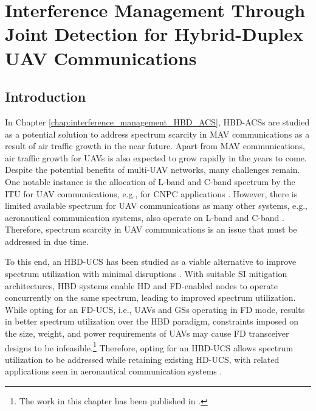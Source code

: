 \chapter{Interference Management Through Joint Detection for Hybrid-Duplex UAV Communications}
\label{chap:JD_HBD_UCS}
\section{Introduction}
In Chapter \ref{chap:interference_management_HBD_ACS}, HBD-ACSs are studied as a potential solution to address spectrum scarcity in MAV communications as a result of air traffic growth in the near future. Apart from MAV communications, air traffic growth for UAVs is also expected to grow rapidly in the years to come. Despite the potential benefits of multi-UAV networks, many challenges remain. One notable instance is the allocation of L-band and C-band spectrum by the ITU for UAV communications, e.g., for CNPC applications \cite{matolak2017air_suburban}. However, there is limited available spectrum for UAV communications as many other systems, e.g., aeronautical communication systems, also operate on L-band and C-band \cite{matolak2017air_suburban}. Therefore, spectrum scarcity in UAV communications is an issue that must be addressed in due time. 

To this end, an HBD-UCS has been studied as a viable alternative to improve spectrum utilization with minimal disruptions \cite{tan2018ricianShad}. With suitable SI mitigation architectures, HBD systems enable HD and FD-enabled nodes to operate concurrently on the same spectrum, leading to improved spectrum utilization. While opting for an FD-UCS, i.e., UAVs and GSs operating in FD mode, results in better spectrum utilization over the HBD paradigm, constraints imposed on the size, weight, and power requirements of UAVs may cause FD transceiver designs to be infeasible.\footnote{The work in this chapter has been published in \cite{tan2018joint}.} Therefore, opting for an HBD-UCS allows spectrum utilization to be addressed while retaining existing HD-UCS, with related applications seen in aeronautical communication systems \cite{ernest2018performance,ernest2019outage}.

